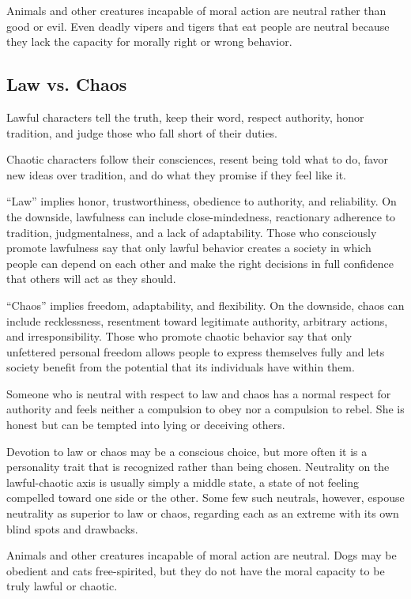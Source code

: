 Animals and other creatures incapable of moral action are neutral rather than good or evil. Even deadly vipers and tigers that eat people are neutral because they lack the capacity for morally right or wrong behavior.

\subsection{Law vs. Chaos}
Lawful characters tell the truth, keep their word, respect authority, honor tradition, and judge those who fall short of their duties.

Chaotic characters follow their consciences, resent being told what to do, favor new ideas over tradition, and do what they promise if they feel like it.

``Law'' implies honor, trustworthiness, obedience to authority, and reliability. On the downside, lawfulness can include close-mindedness, reactionary adherence to tradition, judgmentalness, and a lack of adaptability. Those who consciously promote lawfulness say that only lawful behavior creates a society in which people can depend on each other and make the right decisions in full confidence that others will act as they should.

``Chaos'' implies freedom, adaptability, and flexibility. On the downside, chaos can include recklessness, resentment toward legitimate authority, arbitrary actions, and irresponsibility. Those who promote chaotic behavior say that only unfettered personal freedom allows people to express themselves fully and lets society benefit from the potential that its individuals have within them.

Someone who is neutral with respect to law and chaos has a normal respect for authority and feels neither a compulsion to obey nor a compulsion to rebel. She is honest but can be tempted into lying or deceiving others.

Devotion to law or chaos may be a conscious choice, but more often it is a personality trait that is recognized rather than being chosen. Neutrality on the lawful-chaotic axis is usually simply a middle state, a state of not feeling compelled toward one side or the other. Some few such neutrals, however, espouse neutrality as superior to law or chaos, regarding each as an extreme with its own blind spots and drawbacks.

Animals and other creatures incapable of moral action are neutral. Dogs may be obedient and cats free-spirited, but they do not have the moral capacity to be truly lawful or chaotic.

